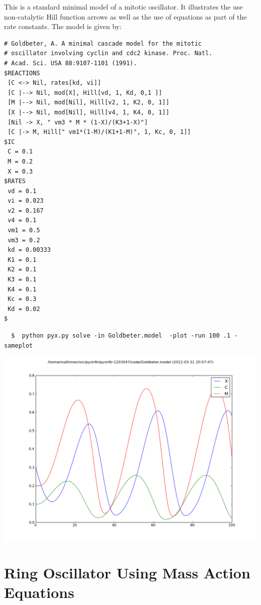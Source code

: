 This is a standard minimal model of a mitotic oscillator\cite{Goldbeter}. It illustrates the use non-catalytic Hill function arrows as well as the use of equations as part of the rate constants. The model is given by:
\begin{tiny}
\begin{Verbatim}[frame=single]
# Goldbeter, A. A minimal cascade model for the mitotic
# oscillator involving cyclin and cdc2 kinase. Proc. Natl.
# Acad. Sci. USA 88:9107-1101 (1991).
$REACTIONS
 [C <-> Nil, rates[kd, vi]]
 [C |--> Nil, mod[X], Hill[vd, 1, Kd, 0,1 ]]
 [M |--> Nil, mod[Nil], Hill[v2, 1, K2, 0, 1]]
 [X |--> Nil, mod[Nil], Hill[v4, 1, K4, 0, 1]]
 [Nil -> X, " vm3 * M * (1-X)/(K3+1-X)"]
 [C |-> M, Hill[" vm1*(1-M)/(K1+1-M)", 1, Kc, 0, 1]]
$IC
 C = 0.1
 M = 0.2
 X = 0.3
$RATES
 vd = 0.1
 vi = 0.023
 v2 = 0.167
 v4 = 0.1
 vm1 = 0.5
 vm3 = 0.2
 kd = 0.00333
 K1 = 0.1
 K2 = 0.1
 K3 = 0.1
 K4 = 0.1
 Kc = 0.3
 Kd = 0.02
$
\end{Verbatim}
\end{tiny}
\begin{verbatim}
  $  python pyx.py solve -in Goldbeter.model  -plot -run 100 .1 -sameplot
\end{verbatim}
\begin{center}
\includegraphics[width=.85\textwidth]{Goldbeter.png}
\end{center}

\pagebreak

\section[Ring Oscillator (Mass Action)]{Ring Oscillator Using Mass Action Equations}

